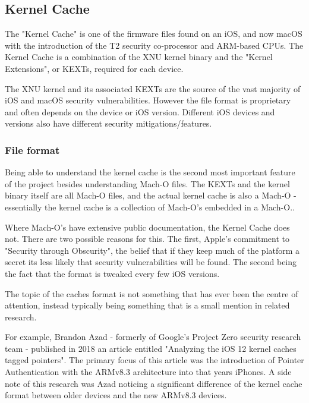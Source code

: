 \subsection{Kernel Cache}

The "Kernel Cache" is one of the firmware files found on an iOS, and now macOS with the introduction of the T2 security co-processor and ARM-based CPUs. The Kernel Cache is a combination of the XNU kernel binary and the "Kernel Extensions", or KEXTs, required for each device.\cite{kcache-iphonewiki}

The XNU kernel and its associated KEXTs are the source of the vast majority of iOS and macOS security vulnerabilities. However the file format is proprietary and often depends on the device or iOS version. Different iOS devices and versions also have different security mitigations/features. 

\subsubsection{File format}

Being able to understand the kernel cache is the second most important feature of the project besides understanding Mach-O files. The KEXTs and the kernel binary itself are all Mach-O files, and the actual kernel cache is also a Mach-O - essentially the kernel cache is a collection of Mach-O's embedded in a Mach-O.\cite{find-reference}.

Where Mach-O's have extensive public documentation, the Kernel Cache does not. There are two possible reasons for this. The first, Apple's commitment to "Security through Obscurity"\cite{security-through-obscurity}, the belief that if they keep much of the platform a secret its less likely that security vulnerabilities will be found. The second being the fact that the format is tweaked every few iOS versions.

The topic of the caches format is not something that has ever been the centre of attention, instead typically being something that is a small mention in related research.

For example, Brandon Azad - formerly of Google's Project Zero security research team - published in 2018 an article entitled "Analyzing the iOS 12 kernel caches tagged pointers"\cite{azad-tagged-pointers}. The primary focus of this article was the introduction of Pointer Authentication\cite{rutland-pac-slides} with the ARMv8.3 architecture into that years iPhones. A side note of this research was Azad noticing a significant difference of the kernel cache format between older devices and the new ARMv8.3 devices. 

